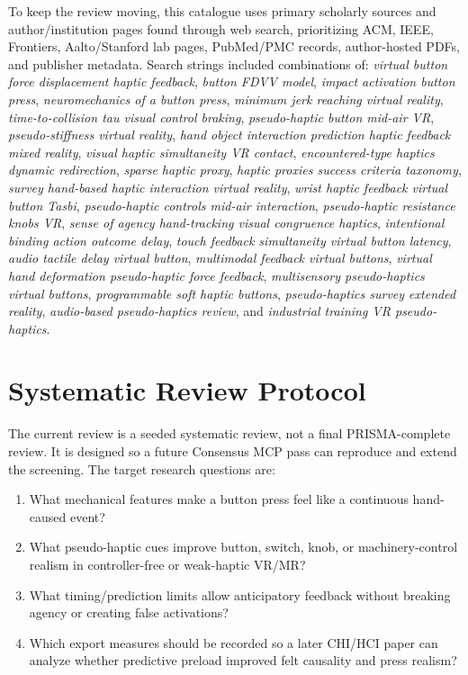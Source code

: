 \documentclass[11pt]{article}
\begin{document}
To keep the review moving, this catalogue uses primary scholarly sources and author/institution pages found through web search, prioritizing ACM, IEEE, Frontiers, Aalto/Stanford lab pages, PubMed/PMC records, author-hosted PDFs, and publisher metadata. Search strings included combinations of: \emph{virtual button force displacement haptic feedback}, \emph{button FDVV model}, \emph{impact activation button press}, \emph{neuromechanics of a button press}, \emph{minimum jerk reaching virtual reality}, \emph{time-to-collision tau visual control braking}, \emph{pseudo-haptic button mid-air VR}, \emph{pseudo-stiffness virtual reality}, \emph{hand object interaction prediction haptic feedback mixed reality}, \emph{visual haptic simultaneity VR contact}, \emph{encountered-type haptics dynamic redirection}, \emph{sparse haptic proxy}, \emph{haptic proxies success criteria taxonomy}, \emph{survey hand-based haptic interaction virtual reality}, \emph{wrist haptic feedback virtual button Tasbi}, \emph{pseudo-haptic controls mid-air interaction}, \emph{pseudo-haptic resistance knobs VR}, \emph{sense of agency hand-tracking visual congruence haptics}, \emph{intentional binding action outcome delay}, \emph{touch feedback simultaneity virtual button latency}, \emph{audio tactile delay virtual button}, \emph{multimodal feedback virtual buttons}, \emph{virtual hand deformation pseudo-haptic force feedback}, \emph{multisensory pseudo-haptics virtual buttons}, \emph{programmable soft haptic buttons}, \emph{pseudo-haptics survey extended reality}, \emph{audio-based pseudo-haptics review}, and \emph{industrial training VR pseudo-haptics}.

\section{Systematic Review Protocol}
The current review is a seeded systematic review, not a final PRISMA-complete review. It is designed so a future Consensus MCP pass can reproduce and extend the screening. The target research questions are:
\begin{enumerate}
  \item What mechanical features make a button press feel like a continuous hand-caused event?
  \item What pseudo-haptic cues improve button, switch, knob, or machinery-control realism in controller-free or weak-haptic VR/MR?
  \item What timing/prediction limits allow anticipatory feedback without breaking agency or creating false activations?
  \item Which export measures should be recorded so a later CHI/HCI paper can analyze whether predictive preload improved felt causality and press realism?
\end{enumerate}
\end{document}
